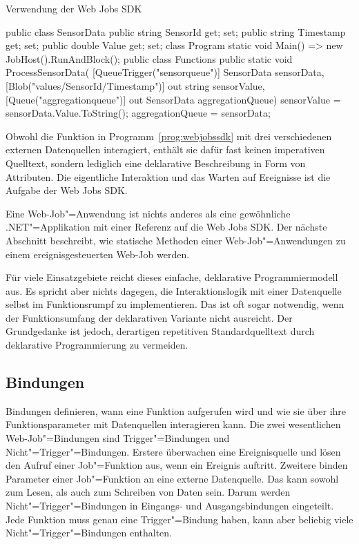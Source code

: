 \begin{program}[!hbt]
\caption{Verwendung der Web Jobs SDK}
\label{prog:webjobssdk}
\begin{CsCode}
public class SensorData {
  public string SensorId { get; set; }
  public string Timestamp { get; set; }
  public double Value { get; set; }
}
class Program {
  static void Main() => new JobHost().RunAndBlock();
}
public class Functions {
  public static void ProcessSensorData(
    [QueueTrigger("sensorqueue")] SensorData sensorData,
    [Blob("values/{SensorId}/{Timestamp}")] out string sensorValue,
    [Queue("aggregationqueue")] out SensorData aggregationQueue) {
    sensorValue = sensorData.Value.ToString();
    aggregationQueue = sensorData;
  }
}
\end{CsCode}
\end{program}

Obwohl die Funktion in Programm~\ref{prog:webjobssdk} mit drei verschiedenen externen Datenquellen interagiert, enthält sie dafür fast keinen imperativen Quelltext, sondern lediglich eine deklarative Beschreibung in Form von Attributen. Die eigentliche Interaktion und das Warten auf Ereignisse ist die Aufgabe der Web Jobs SDK. 

Eine Web-Job"=Anwendung ist nichts anderes als eine gewöhnliche .NET"=Applikation mit einer Referenz auf die Web Jobs SDK. Der nächste Abschnitt beschreibt, wie statische Methoden einer Web-Job"=Anwendungen zu einem ereignisgesteuerten Web-Job werden.

Für viele Einsatzgebiete reicht dieses einfache, deklarative Programmiermodell aus. Es spricht aber nichts dagegen, die Interaktionslogik mit einer Datenquelle selbst im Funktionsrumpf zu implementieren. Das ist oft sogar notwendig, wenn der Funktionsumfang der deklarativen Variante nicht ausreicht. Der Grundgedanke ist jedoch, derartigen repetitiven Standardquelltext durch deklarative Programmierung zu vermeiden.

\subsection{Bindungen}

Bindungen definieren, wann eine Funktion aufgerufen wird und wie sie über ihre Funktionsparameter mit Datenquellen interagieren kann. Die zwei wesentlichen Web-Job"=Bindungen sind Trigger"=Bindungen und Nicht"=Trigger"=Bindungen. Erstere überwachen eine Ereignisquelle und lösen den Aufruf einer Job"=Funktion aus, wenn ein Ereignis auftritt. Zweitere binden Parameter einer Job"=Funktion an eine externe Datenquelle. Das kann sowohl zum Lesen, als auch zum Schreiben von Daten sein. Darum werden Nicht"=Trigger"=Bindungen in Eingangs- und Ausgangsbindungen eingeteilt. Jede Funktion muss genau eine Trigger"=Bindung haben, kann aber beliebig viele Nicht"=Trigger"=Bindungen enthalten.

